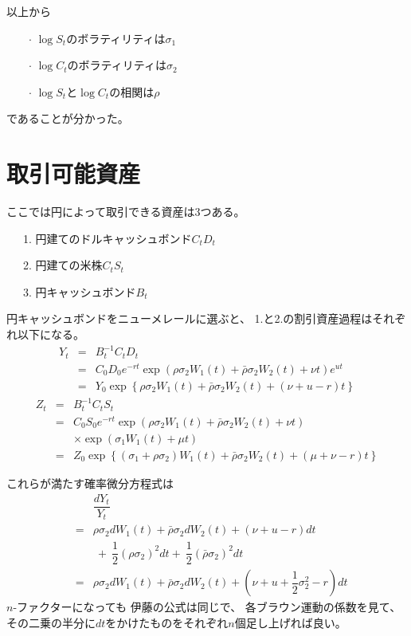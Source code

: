 \documentclass[uplatex,a4j,12pt,dvipdfmx]{jsarticle}
\begin{document}
以上から

\ \ \ \ $\cdot$ $\log S_{t}$のボラティリティは$\sigma_{1}$

\ \ \ \ $\cdot$ $\log C_{t}$のボラティリティは$\sigma_{2}$

\ \ \ \ $\cdot$ $\log S_{t}$と$\log C_{t}$の相関は$\rho$

であることが分かった。

\section{取引可能資産}

ここでは円によって取引できる資産は3つある。

\ \ \ 1. 円建てのドルキャッシュボンド$C_{t} D_{t}$

\ \ \ 2. 円建ての米株$C_{t} S_{t}$

\ \ \ 3. 円キャッシュボンド$B_{t}$

円キャッシュボンドをニューメレールに選ぶと、
1.と2.の割引資産過程はそれぞれ以下になる。
%
%
\begin{eqnarray*}
	Y_{t}
	&=&
	B^{-1}_{t} C_{t} D_{t}
	\\ &=&
	C_{0} D_{0}
	e^{-rt}
	\exp \left(
	\rho \sigma_{2} W_{1}(t) +
	\bar{\rho} \sigma_{2} W_{2}(t) + \nu t \right)
	e^{ut}
	\\ &=&
	Y_{0}
	\exp \left\{
	\rho \sigma_{2} W_{1}(t) +
	\bar{\rho} \sigma_{2} W_{2}(t) + (\nu + u - r) t \right\}
\end{eqnarray*}
%
%
%
%
\begin{eqnarray*}
	Z_{t}
	&=&
	B^{-1}_{t} C_{t} S_{t}
	\\ &=&
	C_{0} S_{0}
	e^{-rt}
	\exp \left(
	\rho \sigma_{2} W_{1}(t) +
	\bar{\rho} \sigma_{2} W_{2}(t) + \nu t \right)
	\\ && \times
	\exp \left( \sigma_{1} W_{1}(t) + \mu t \right)
	\\ &=&
	Z_{0}
	\exp \left\{
	(\sigma_{1} + \rho \sigma_{2}) W_{1}(t) +
	\bar{\rho} \sigma_{2} W_{2}(t) + ( \mu + \nu - r ) t \right\}
\end{eqnarray*}
%
%

これらが満たす確率微分方程式は
%
%
\begin{eqnarray*}
	&&
	\dfrac{dY_{t}}{Y_{t}}
	\\ &=&
	\rho \sigma_{2} dW_{1}(t) +
	\bar{\rho} \sigma_{2} dW_{2}(t) + \left( \nu + u - r \right) dt
	\\ && \
	+ \
	\dfrac{1}{2}(\rho \sigma_{2})^{2} dt
	+ \
	\dfrac{1}{2}(\bar{\rho} \sigma_{2})^{2} dt
	\\ &=&
	\rho \sigma_{2} dW_{1}(t) +
	\bar{\rho} \sigma_{2} dW_{2}(t) + \left( \nu + u + \dfrac{1}{2} \sigma_{2}^{2} - r \right) dt
\end{eqnarray*}
%
%
$n$-ファクターになっても
伊藤の公式は同じで、
各ブラウン運動の係数を見て、
その二乗の半分に$dt$をかけたものをそれぞれ$n$個足し上げれば良い。
\end{document}
